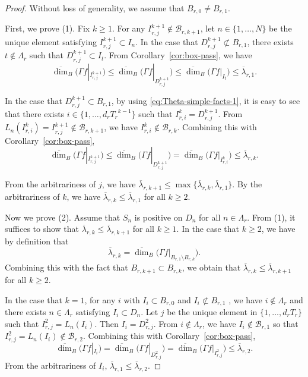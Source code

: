 \documentclass[11pt]{amsart}
\theoremstyle{definition}
\theoremstyle{remark}
\numberwithin{equation}{section}
\newcommand{\mB}{{\mathcal B}}
\newcommand{\uplam}{{\overline{\lambda}}}
\def\updimB{\overline{\dim}_B}
\begin{document}
\begin{proof}
	Without loss of generality, we assume that $B_{r,0}\not=B_{r,1}$. 
	
	First, we prove (1). Fix $k\geq 1$. For any $I_{r,j}^{k+1}\not\in \mB_{r,k+1}$, let $n\in \{1,\ldots,N\}$ be the unique element satisfying $I_{r,j}^{k+1}\subset I_n$.
	In the case that $D_{r,j}^{k+1} \not\subset B_{r,1}$, there exists $t \notin \Lambda_r$ such that $D_{r,j}^{k+1} \subset I_t$. From Corollary~\ref{cor:box-pass}, we have
	\[
	\updimB \big(\Gamma f |_{I_{r,j}^{k+1}}\big) \leq \updimB \big(\Gamma f |_{D_{r,j}^{k+1}}\big)
	\leq \updimB \big(\Gamma f |_{I_t}\big) \leq \uplam_{r,1}.
	\]
	
	In the case that $D_{r,j}^{k+1} \subset B_{r,1}$, by using \eqref{eq:Theta-simple-facts-1}, it is easy to see that there exists $i\in\{1,\ldots, d_r{T_r}^{k-1}\}$ such that $I_{r,i}^k=D_{r,j}^{k+1}$. From $L_n(I_{r,i}^k)=I_{r,j}^{k+1}\not\in \mB_{r,k+1}$, we have $I_{r,i}^k\not\in\mB_{r,k}$. Combining this with Corollary~\ref{cor:box-pass}, 
	\[
	\updimB \big(\Gamma f |_{I_{r,j}^{k+1}}\big) \leq \updimB \big(\Gamma f |_{D_{r,j}^{k+1}}\big)= \updimB \big(\Gamma f |_{I_{r,i}^{k}}\big)\leq \uplam_{r,k}.
	\]
	
	From the arbitrariness of $j$, we have $\uplam_{r,k+1}\leq \max\{ \uplam_{r,k},\uplam_{r,1}\}$.
	By the arbitrariness of $k$, we have $\uplam_{r,k} \leq \uplam_{r,1}$ for all $k\geq 2$.
	
	Now we prove (2). Assume that $S_n$ is positive on $D_n$ for all $n\in \Lambda_r$. From (1), it suffices to show that $\uplam_{r,k}\leq \uplam_{r,k+1}$ for all $k\geq 1$. In the case that $k\geq 2$, we have by definition that
	\[
	\uplam_{r,k}=\updimB\big( \Gamma f|_{ B_{r,1} \setminus B_{r,k} }\big).
	\]
	Combining this with the fact that $B_{r,k+1} \subset B_{r,k}$, we obtain that $\uplam_{r,k}\leq \uplam_{r,k+1}$ for all $k\geq 2$.
	
	In the case that $k=1$, for any $i$ with $I_i \subset B_{r,0}$ and $I_i \not\subset B_{r,1}$ , we have $i\not\in \Lambda_r$ and there exists $n\in \Lambda_r$ satisfying $I_i\subset D_n$. Let $j$ be the unique element in $\{1,\ldots, d_rT_r\}$ such that $I_{r,j}^2=L_n(I_i)$. Then $I_i=D_{r,j}^2 $. From $i\not\in \Lambda_r$, we have $I_i\not \in \mB_{r,1}$ so that $I_{r,j}^2=L_n(I_i)\not\in \mB_{r,2}$. 
	Combining this with Corollary~\ref{cor:box-pass}, 
	\begin{equation*}%
		\updimB \big(\Gamma f|_{I_i} \big)=\updimB \big(\Gamma f|_{D_{r,j}^2} \big)=\updimB \big(\Gamma f|_{I_{r,j}^2} \big)\leq \uplam_{r,2}.
	\end{equation*}
	From the arbitrariness of $I_i$, $\uplam_{r,1} \leq  \uplam_{r,2}$.
\end{proof}
\end{document}

